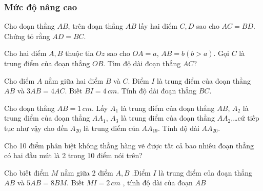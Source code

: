 \subsubsection*{Mức độ nâng cao}
\begin{bt}
	Cho đoạn thẳng $AB$, trên đoạn thẳng $AB$ lấy hai điểm $C,D$ sao cho $AC=BD$. Chứng tỏ rằng $AD=BC$.
	\begin{loigiaichuong1}
		
	\end{loigiaichuong1}
\end{bt}
\begin{bt}
	Cho hai điểm $A,B$ thuộc tia $Oz$ sao cho $OA=a$, $AB=b\left( b>a \right)$. Gọi $C$ là trung điểm của đoạn thẳng $OB$. Tìm độ dài đoạn thẳng $AC$?
	\begin{loigiaichuong1}
		
	\end{loigiaichuong1}
\end{bt}
\begin{bt}
	Cho điểm $A$ nằm giữa hai điểm $B$ và $C$. Điểm $I$ là trung điểm của đoạn thẳng $AB$ và $3AB=4AC$. Biết $BI=4\,cm$. Tính độ dài đoạn thẳng $BC$.
	\begin{loigiaichuong1}
		
	\end{loigiaichuong1}
\end{bt}
\begin{bt}
	Cho đoạn thẳng $AB=1\,cm$. Lấy ${{A}_{1}}$ là trung điểm của đoạn thẳng $AB$, ${{A}_{2}}$ là trung điểm của đoạn thẳng $A{{A}_{1}}$, ${{A}_{3}}$ là trung điểm của đoạn thẳng $A{{A}_{2}}$,\ldots cứ tiếp tục như vậy cho đến ${{A}_{20}}$ là trung điểm của $A{{A}_{19}}$. Tính độ dài $A{{A}_{20}}$.
	\begin{loigiaichuong1}
		
	\end{loigiaichuong1}
\end{bt}
\begin{bt}
	Cho 10 điểm phân biệt không thẳng hàng vẽ được tất cả bao nhiêu đoạn thẳng có hai đầu mút là 2 trong 10 điểm nói trên?
	\begin{loigiaichuong1}
		
	\end{loigiaichuong1}
\end{bt}
\begin{bt}
	Cho biết điểm $M$ nằm giữa 2 điểm $A,B$ .Điểm  $I$ là trung điểm của đoạn thẳng $AB$  và  $5AB=8BM$.  Biết  $MI=2\,cm$ , tính độ dài của đoạn $AB$ 
\end{bt}
